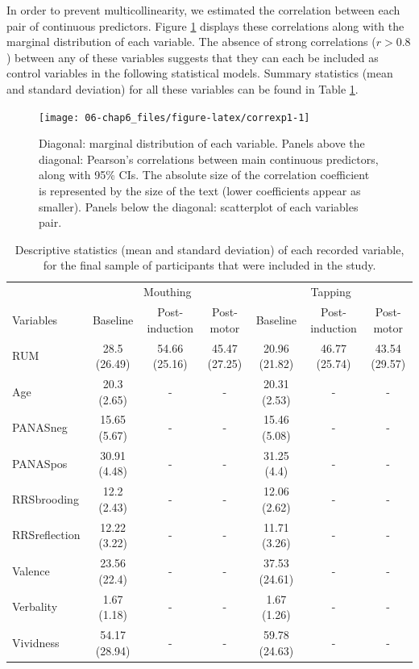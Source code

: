 \documentclass[a4paper,12pt,twoside,openright,oldfontcommands]{memoir}
\makeatletter
\newenvironment{lltable}{\begin{landscape}\begin{center}\begin{ThreePartTable}}{\end{ThreePartTable}\end{center}\end{landscape}}
\newcommand\LastLTentrywidth{1em}
\newlength\longtablewidth
\newcommand{\getlongtablewidth}{\begingroup \ifcsname LT@\roman{LT@tables}\endcsname \global\longtablewidth=0pt \renewcommand{\LT@entry}[2]{\global\advance\longtablewidth by ##2\relax\gdef\LastLTentrywidth{##2}}\@nameuse{LT@\roman{LT@tables}} \fi \endgroup}
\makeatother
\begin{document}
In order to prevent multicollinearity, we estimated the correlation between each pair of continuous predictors. Figure \ref{fig:correxp1} displays these correlations along with the marginal distribution of each variable. The absence of strong correlations (\(r > 0.8\)) between any of these variables suggests that they can each be included as control variables in the following statistical models. Summary statistics (mean and standard deviation) for all these variables can be found in Table \ref{tab:sumstat}.

\begin{figure}[H]
\texttt{[image: 06-chap6\_files/figure-latex/correxp1-1]} \caption{Diagonal: marginal distribution of each variable. Panels above the diagonal: Pearson's correlations between main continuous predictors, along with 95\% CIs. The absolute size of the correlation coefficient is represented by the size of the text (lower coefficients appear as smaller). Panels below the diagonal: scatterplot of each variables pair.}\label{fig:correxp1}
\end{figure}

\begin{lltable}
\small{
\begin{longtable}{lcccccc}\noalign{\getlongtablewidth\global\LTcapwidth=\longtablewidth}
\caption{\label{tab:sumstat}Descriptive statistics (mean and standard deviation) of each recorded variable, for the final sample of participants that were included in the study.}\\
\toprule
 & \multicolumn{3}{c}{Mouthing} & \multicolumn{3}{c}{Tapping} \\
\cmidrule(r){2-4} \cmidrule(r){5-7}
Variables & Baseline & Post-induction & Post-motor & Baseline & Post-induction & Post-motor\\
\midrule
RUM & 28.5 (26.49) & 54.66 (25.16) & 45.47 (27.25) & 20.96 (21.82) & 46.77 (25.74) & 43.54 (29.57)\\
Age & 20.3 (2.65) & - & - & 20.31 (2.53) & - & -\\
PANASneg & 15.65 (5.67) & - & - & 15.46 (5.08) & - & -\\
PANASpos & 30.91 (4.48) & - & - & 31.25 (4.4) & - & -\\
RRSbrooding & 12.2 (2.43) & - & - & 12.06 (2.62) & - & -\\
RRSreflection & 12.22 (3.22) & - & - & 11.71 (3.26) & - & -\\
Valence & 23.56 (22.4) & - & - & 37.53 (24.61) & - & -\\
Verbality & 1.67 (1.18) & - & - & 1.67 (1.26) & - & -\\
Vividness & 54.17 (28.94) & - & - & 59.78 (24.63) & - & -\\
\bottomrule
\end{longtable}
}
\end{lltable}
\end{document}
